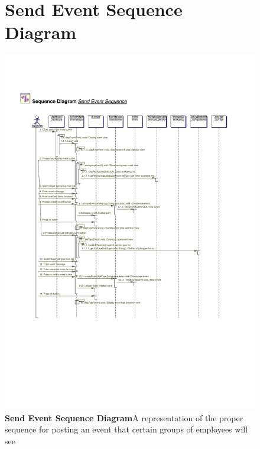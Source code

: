 \documentclass[letterpaper,12pt]{report}
\begin{document}
\begin{figure}[hbp]
 \section{Send Event Sequence Diagram}
 \includegraphics[scale=0.65]{externals/SequenceDiagrams11.pdf}
 \caption{\small
\textbf{Send Event Sequence Diagram}\newline A representation of the proper sequence for posting an event that certain groups of employees will see}\label{fig:seqSendEvent}
\end{figure}
\newpage
\end{document}

